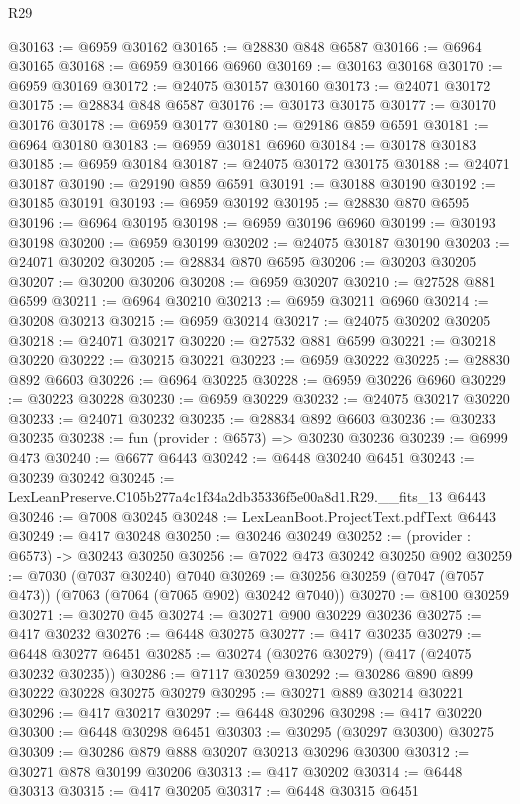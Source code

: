 \begin{lexlean}{R29}
\begin{coremodule}
@30163 := @6959 @30162
@30165 := @28830 @848 @6587
@30166 := @6964 @30165
@30168 := @6959 @30166 @6960
@30169 := @30163 @30168
@30170 := @6959 @30169
@30172 := @24075 @30157 @30160
@30173 := @24071 @30172
@30175 := @28834 @848 @6587
@30176 := @30173 @30175
@30177 := @30170 @30176
@30178 := @6959 @30177
@30180 := @29186 @859 @6591
@30181 := @6964 @30180
@30183 := @6959 @30181 @6960
@30184 := @30178 @30183
@30185 := @6959 @30184
@30187 := @24075 @30172 @30175
@30188 := @24071 @30187
@30190 := @29190 @859 @6591
@30191 := @30188 @30190
@30192 := @30185 @30191
@30193 := @6959 @30192
@30195 := @28830 @870 @6595
@30196 := @6964 @30195
@30198 := @6959 @30196 @6960
@30199 := @30193 @30198
@30200 := @6959 @30199
@30202 := @24075 @30187 @30190
@30203 := @24071 @30202
@30205 := @28834 @870 @6595
@30206 := @30203 @30205
@30207 := @30200 @30206
@30208 := @6959 @30207
@30210 := @27528 @881 @6599
@30211 := @6964 @30210
@30213 := @6959 @30211 @6960
@30214 := @30208 @30213
@30215 := @6959 @30214
@30217 := @24075 @30202 @30205
@30218 := @24071 @30217
@30220 := @27532 @881 @6599
@30221 := @30218 @30220
@30222 := @30215 @30221
@30223 := @6959 @30222
@30225 := @28830 @892 @6603
@30226 := @6964 @30225
@30228 := @6959 @30226 @6960
@30229 := @30223 @30228
@30230 := @6959 @30229
@30232 := @24075 @30217 @30220
@30233 := @24071 @30232
@30235 := @28834 @892 @6603
@30236 := @30233 @30235
@30238 := fun (provider : @6573) => @30230 @30236
@30239 := @6999 @473
@30240 := @6677 @6443
@30242 := @6448 @30240 @6451
@30243 := @30239 @30242
@30245 := LexLeanPreserve.C105b277a4c1f34a2db35336f5e00a8d1.R29.__fits_13 @6443
@30246 := @7008 @30245
@30248 := LexLeanBoot.ProjectText.pdfText @6443
@30249 := @417 @30248
@30250 := @30246 @30249
@30252 := (provider : @6573) -> @30243 @30250
@30256 := @7022 @473 @30242 @30250 @902
@30259 := @7030 (@7037 @30240) @7040
@30269 := @30256 @30259 (@7047 (@7057 @473)) (@7063 (@7064 (@7065 @902) @30242 @7040))
@30270 := @8100 @30259
@30271 := @30270 @45
@30274 := @30271 @900 @30229 @30236
@30275 := @417 @30232
@30276 := @6448 @30275
@30277 := @417 @30235
@30279 := @6448 @30277 @6451
@30285 := @30274 (@30276 @30279) (@417 (@24075 @30232 @30235))
@30286 := @7117 @30259
@30292 := @30286 @890 @899 @30222 @30228 @30275 @30279
@30295 := @30271 @889 @30214 @30221
@30296 := @417 @30217
@30297 := @6448 @30296
@30298 := @417 @30220
@30300 := @6448 @30298 @6451
@30303 := @30295 (@30297 @30300) @30275
@30309 := @30286 @879 @888 @30207 @30213 @30296 @30300
@30312 := @30271 @878 @30199 @30206
@30313 := @417 @30202
@30314 := @6448 @30313
@30315 := @417 @30205
@30317 := @6448 @30315 @6451

\end{coremodule}
\end{lexlean}
